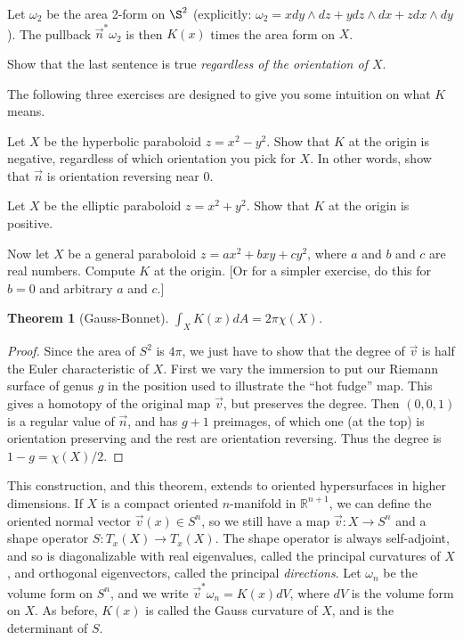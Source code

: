 \documentclass[12pt]{amsbook}
\newcommand{\R}{{\mathbb R}}
\newtheorem{thm}{Theorem}[section]
\theoremstyle{definition}
\begin{document}
Let
$\omega_2$ be the area 2-form on $\S^2$ (explicitly: $\omega_2 = x dy
\wedge dz + y dz \wedge dx + z dx \wedge dy$). The pullback $\vec n^*
\omega_2$ is then $K(x)$ times the area form on $X$. 

\smallskip

 Show that the last sentence is true
{\em regardless of the orientation of $X$}.

\smallskip


The following three exercises are designed to give you some intuition
on what $K$ means.

 Let $X$ be the hyperbolic paraboloid
$z=x^2-y^2$. Show that $K$ at the origin is negative, regardless of
which orientation you pick for $X$. In other words, show that $\vec n$
is orientation reversing near $0$.

 Let $X$ be the elliptic paraboloid
$z=x^2+y^2$. Show that $K$ at the origin is positive.

 Now let $X$ be a general paraboloid $z =
ax^2 + bxy + cy^2$, where $a$ and $b$ and $c$ are real numbers.
Compute $K$ at the origin. [Or for a simpler exercise, do this for
$b=0$ and arbitrary $a$ and $c$.]

\begin{thm}[Gauss-Bonnet] $\int_X K(x) dA = 2 \pi \chi(X)$. \end{thm}

\begin{proof} Since the area of $S^2$ is $4 \pi$, we just have to show
  that the degree of $\vec v$ is half the Euler characteristic of
  $X$. First we vary the immersion to put our Riemann surface of genus
  $g$ in the position used to illustrate the ``hot fudge'' map.  This
  gives a homotopy of the original map $\vec v$, but preserves the
  degree. Then $(0,0,1)$ is a regular value of $\vec n$, and has $g+1$
  preimages, of which one (at the top) is orientation preserving and
  the rest are orientation reversing. Thus the degree is $1-g =
  \chi(X)/2$. \end{proof}

This construction, and this theorem, extends to oriented hypersurfaces 
in higher dimensions.
If $X$ is a compact oriented $n$-manifold in $\R^{n+1}$, we can define the
oriented normal vector $\vec v(x) \in S^n$, so we still have a map
$\vec v: X \to S^n$ and a shape operator $S: T_x(X) \to T_x(X)$. 
The shape operator is always self-adjoint, and so is diagonalizable with 
real eigenvalues, called the principal curvatures of $X$, and orthogonal 
eigenvectors, called the principal {\em directions}. 
Let $\omega_n$ be the volume form on $S^n$, and
we write $\vec v^* \omega_n = K(x) dV$, where $dV$ is the volume form
on $X$. As before, $K(x)$ is called the Gauss curvature of $X$, and is the 
determinant of $S$. 
\end{document}

